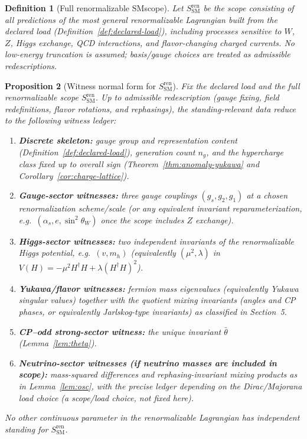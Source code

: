 \documentclass[11pt]{article}
\newtheorem{definition}{Definition}[section]
\newtheorem{proposition}[definition]{Proposition}
\theoremstyle{remark}
\newcommand{\SM}{\ensuremath{\mathrm{SM}}}
\begin{document}
\begin{definition}[Full renormalizable \SM scope]\label{def:scope-SM-ren}
Let $S_{\SM}^{\mathrm{ren}}$ be the scope consisting of all predictions of the most general
\emph{renormalizable} Lagrangian built from the declared load (Definition~\ref{def:declared-load}), including
processes sensitive to $W$, $Z$, Higgs exchange, QCD interactions, and flavor-changing charged currents.
No low-energy truncation is assumed; basis/gauge choices are treated as admissible redescriptions.
\end{definition}

\begin{proposition}[Witness normal form for $S_{\SM}^{\mathrm{ren}}$]\label{prop:SM-ren-NF}
Fix the declared load and the full renormalizable scope $S_{\SM}^{\mathrm{ren}}$.
Up to admissible redescription (gauge fixing, field redefinitions, flavor rotations, and rephasings),
the standing-relevant data reduce to the following witness ledger:
\begin{enumerate}[label=(\roman*),leftmargin=2.2em]
\item \textbf{Discrete skeleton:} gauge group and representation content (Definition~\ref{def:declared-load}),
generation count $n_g$, and the hypercharge class fixed up to overall sign (Theorem~\ref{thm:anomaly-yukawa}
and Corollary~\ref{cor:charge-lattice}).
\item \textbf{Gauge-sector witnesses:} three gauge couplings $(g_s,g_2,g_1)$ at a chosen renormalization
scheme/scale (or any equivalent invariant reparameterization, e.g.\ $(\alpha_s, e,\sin^2\theta_W)$ once the
scope includes $Z$ exchange).
\item \textbf{Higgs-sector witnesses:} two independent invariants of the renormalizable Higgs potential, e.g.\
$(v,m_h)$ (equivalently $(\mu^2,\lambda)$ in $V(H)=-\mu^2 H^\dagger H+\lambda(H^\dagger H)^2$).
\item \textbf{Yukawa/flavor witnesses:} fermion mass eigenvalues (equivalently Yukawa singular values) together
with the quotient mixing invariants (angles and CP phases, or equivalently Jarlskog-type invariants) as
classified in Section~5.
\item \textbf{CP--odd strong-sector witness:} the unique invariant $\bar\theta$ (Lemma~\ref{lem:theta}).
\item \textbf{Neutrino-sector witnesses (if neutrino masses are included in scope):} mass-squared differences and
rephasing-invariant mixing products as in Lemma~\ref{lem:osc}, with the precise ledger depending on the
Dirac/Majorana load choice (a scope/load choice, not fixed here).
\end{enumerate}
No other continuous parameter in the renormalizable Lagrangian has independent standing for
$S_{\SM}^{\mathrm{ren}}$.
\end{proposition}
\end{document}
